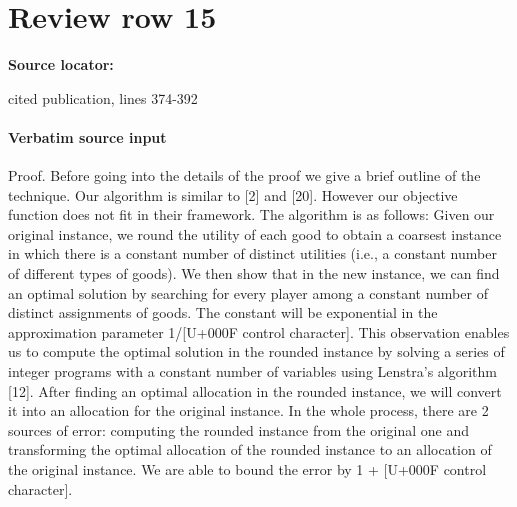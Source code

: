 \documentclass[10pt]{article}
\begin{document}
\section*{Review row 15}
\textbf{Source locator:} {\footnotesize\raggedright cited publication, lines 374-\allowbreak{}392\par}
\paragraph{Verbatim source input}
\begin{ReviewVerbatim}
Proof. Before going into the details of the proof we give
a brief outline of the technique. Our algorithm is similar
to [2] and [20]. However our objective function does not fit
in their framework. The algorithm is as follows: Given our
original instance, we round the utility of each good to obtain
a coarsest instance in which there is a constant number of
distinct utilities (i.e., a constant number of different types of
goods). We then show that in the new instance, we can find
an optimal solution by searching for every player among a
constant number of distinct assignments of goods. The constant will be exponential in the approximation parameter
1/[U+000F control character]. This observation enables us to compute the optimal
solution in the rounded instance by solving a series of integer programs with a constant number of variables using
Lenstra’s algorithm [12]. After finding an optimal allocation
in the rounded instance, we will convert it into an allocation
for the original instance. In the whole process, there are 2
sources of error: computing the rounded instance from the
original one and transforming the optimal allocation of the
rounded instance to an allocation of the original instance.
We are able to bound the error by 1 + [U+000F control character].
\end{ReviewVerbatim}
\end{document}
